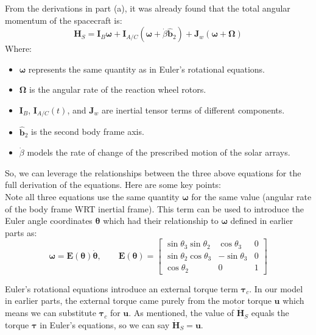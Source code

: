 \documentclass[titlepage]{article}
\begin{document}
From the derivations in part (a), it was already found that the total angular momentum of the spacecraft is:
\begin{equation}
	\boldsymbol{H}_S=\boldsymbol{I}_B\boldsymbol{\omega}+\boldsymbol{I}_{A/C}\left(\boldsymbol{\omega}+\dot{\beta}\hat{\boldsymbol{b}}_2\right)+\boldsymbol{J}_w\left(\boldsymbol{\omega}+\boldsymbol{\Omega}\right)
\end{equation}
Where:
\begin{itemize}
	\item $\boldsymbol{\omega}$ represents the same quantity as in Euler's rotational equations.
	\item $\boldsymbol{\Omega}$ is the angular rate of the reaction wheel rotors.
	\item $\boldsymbol{I}_B$, $\boldsymbol{I}_{A/C}(t)$, and $\boldsymbol{J}_w$ are inertial tensor terms of different components.
	\item $\hat{\boldsymbol{b}}_2$ is the second body frame axis.
	\item $\dot{\beta}$ models the rate of change of the prescribed motion of the solar arrays.
\end{itemize}

So, we can leverage the relationships between the three above equations for the full derivation of the equations. Here are some key points:\\

Note all three equations use the same quantity $\boldsymbol{\omega}$ for the same value (angular rate of the body frame WRT inertial frame). This term can be used to introduce the Euler angle coordinates $\boldsymbol{\theta}$ which had their relationship to $\boldsymbol{\omega}$ defined in earlier parts as:
\begin{equation}
	\boldsymbol{\omega}=\boldsymbol{E}(\boldsymbol{\theta})\dot{\boldsymbol{\theta}},\qquad
	\boldsymbol{E}(\boldsymbol{\theta})=
	\begin{bmatrix}
		\sin\theta_3\sin\theta_2 & \cos\theta_3 & 0 \\
		\sin\theta_2\cos\theta_3 & -\sin\theta_3 & 0 \\
		\cos\theta_2 & 0 & 1
	\end{bmatrix}
\end{equation}

Euler's rotational equations introduce an external torque term $\boldsymbol{\tau}_c$. In our model in earlier parts, the external torque came purely from the motor torque $\boldsymbol{u}$ which means we can substitute $\boldsymbol{\tau}_c$ for $\boldsymbol{u}$. As mentioned, the value of $\dot{\boldsymbol{H}}_S$ equals the torque $\boldsymbol{\tau}$ in Euler's equations, so we can say $\dot{\boldsymbol{H}}_S=\boldsymbol{u}$.\\
\end{document}
